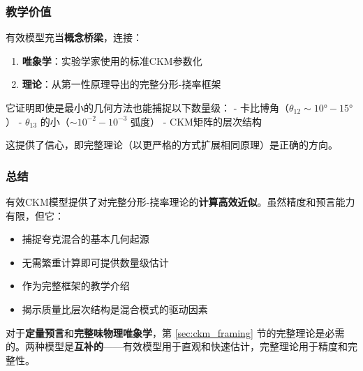 \subsubsection{教学价值}

有效模型充当\textbf{概念桥梁}，连接：

\begin{enumerate}
    \item \textbf{唯象学}：实验学家使用的标准CKM参数化
    \item \textbf{理论}：从第一性原理导出的完整分形-挠率框架
\end{enumerate}

它证明即使是最小的几何方法也能捕捉以下数量级：
- 卡比博角（$\theta_{12} \sim 10°-15°$）
- $\theta_{13}$ 的小（$\sim 10^{-2}-10^{-3}$ 弧度）
- CKM矩阵的层次结构

这提供了信心，即完整理论（以更严格的方式扩展相同原理）是正确的方向。

\subsubsection{总结}

有效CKM模型提供了对完整分形-挠率理论的\textbf{计算高效近似}。虽然精度和预言能力有限，但它：

\begin{itemize}
    \item 捕捉夸克混合的基本几何起源
    \item 无需繁重计算即可提供数量级估计
    \item 作为完整框架的教学介绍
    \item 揭示质量比层次结构是混合模式的驱动因素
\end{itemize}

对于\textbf{定量预言}和\textbf{完整味物理唯象学}，第 \ref{sec:ckm_framing} 节的完整理论是必需的。两种模型是\textbf{互补的}——有效模型用于直观和快速估计，完整理论用于精度和完整性。
